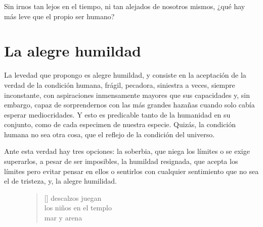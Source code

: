 Sin irnos tan lejos en el tiempo, ni tan alejados de nosotros mismos, ¿qué hay más leve que el propio ser humano? 

\section{La alegre humildad}

La levedad que propongo es alegre humildad, y consiste en la aceptación de la verdad de la condición humana, frágil, pecadora, siniestra a veces, siempre inconstante, con aspiraciones inmensamente mayores que sus capacidades y, sin embargo, capaz de sorprendernos con las más grandes hazañas cuando solo cabía esperar mediocridades. Y esto es predicable tanto de la humanidad en su conjunto, como de cada especimen de nuestra especie. Quizás, la condición humana no sea otra cosa, que el reflejo de la condición del universo.

Ante esta verdad hay tres opciones: la soberbia, que niega los límites o se exige superarlos, a pesar de ser imposibles, la humildad resignada, que acepta los límites pero evitar pensar en ellos o sentirlos con cualquier sentimiento que no sea el de tristeza, y, la alegre humilidad.

\begin{figure}
\settowidth{\versewidth}{los niños en el templo}
\begin{verse}[\versewidth]
\vin descalzos juegan\\
los niños en el templo\\
\vin mar y arena
\end{verse}
\end{figure}

